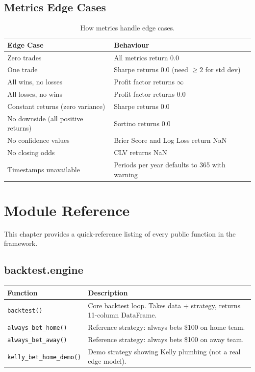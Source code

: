 \documentclass[12pt,a4paper]{report}
\theoremstyle{definition}
\newcommand{\func}[1]{\texttt{#1()}}
\begin{document}
\section{Metrics Edge Cases}

\begin{table}[H]
\centering
\caption{How metrics handle edge cases.}
\label{tab:metrics-edge}
\begin{tabularx}{\textwidth}{lX}
\toprule
\textbf{Edge Case} & \textbf{Behaviour} \\
\midrule
Zero trades & All metrics return 0.0 \\
One trade & Sharpe returns 0.0 (need $\geq 2$ for std dev) \\
All wins, no losses & Profit factor returns $\infty$ \\
All losses, no wins & Profit factor returns 0.0 \\
Constant returns (zero variance) & Sharpe returns 0.0 \\
No downside (all positive returns) & Sortino returns 0.0 \\
No confidence values & Brier Score and Log Loss return NaN \\
No closing odds & CLV returns NaN \\
Timestamps unavailable & Periods per year defaults to 365 with warning \\
\bottomrule
\end{tabularx}
\end{table}


\chapter{Module Reference}
\label{ch:reference}

This chapter provides a quick-reference listing of every public function in the framework.

\section{backtest.engine}

\begin{longtable}{lp{9cm}}
\toprule
\textbf{Function} & \textbf{Description} \\
\midrule
\endhead
\func{backtest} & Core backtest loop. Takes data + strategy, returns 11-column DataFrame. \\
\func{always\_bet\_home} & Reference strategy: always bets \$100 on home team. \\
\func{always\_bet\_away} & Reference strategy: always bets \$100 on away team. \\
\func{kelly\_bet\_home\_demo} & Demo strategy showing Kelly plumbing (not a real edge model). \\
\bottomrule
\end{longtable}
\end{document}
